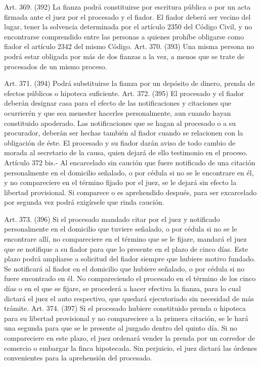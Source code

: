     Art. 369. (392) La fianza podrá constituirse por escritura pública o por un acta firmada ante el juez por el procesado y el fiador.
    El fiador deberá ser vecino del lugar, tener la solvencia determinada por el artículo 2350 del Código Civil, y no encontrarse comprendido entre las personas a quienes prohíbe obligarse como fiador el artículo 2342 del mismo Código.
    Art. 370. (393) Una misma persona no podrá estar obligada por más de dos fianzas a la vez, a menos que se trate de procesados de un mismo proceso.


    Art. 371. (394) Podrá substituirse la fianza por un depósito de dinero, prenda de efectos públicos o hipoteca suficiente.
    Art. 372. (395) El procesado y el fiador deberán designar casa para el efecto de las notificaciones y citaciones que ocurrierén y que sea menester hacerles personalmente, aun cuando hayan constituido apoderado.
    Las notificaciones que se hagan al procesado o a su procurador, deberán ser hechas también al fiador cuando se relacionen con la obligación de éste.
    El procesado y su fiador darán aviso de todo cambio de morada al secretario de la causa, quien dejará de ello testimonio en el proceso.
    Artículo 372 bis.- Al encarcelado sin caución que fuere notificado de una citación personalmente en el domicilio señalado, o por cédula si no se le encontrare en él, y no compareciere en el término fijado por el juez, se le dejará sin efecto la libertad provisional.
Si comparece o es aprehendido después, para ser excarcelado por segunda vez podrá exigírsele que rinda caución.

    Art. 373. (396) Si el procesado mandado citar por el juez y notificado personalmente en el domicilio que tuviere señalado, o por cédula si no se le encontrare allí, no compareciere en el término que se le fijare, mandará el juez que se notifique a su fiador para que lo presente en el plazo de cinco días.
    Este plazo podrá ampliarse a solicitud del fiador siempre que hubiere motivo fundado.
    Se notificará al fiador en el domicilio que hubiere señalado, o por cédula si no fuere encontrado en él. No compareciendo el procesado en el término de los cinco días o en el que se fijare, se procederá a hacer efectiva la fianza, para lo cual dictará el juez el auto respectivo, que quedará ejecutoriado sin necesidad de más trámite.
    Art. 374. (397) Si el procesado hubiere constituido prenda o hipoteca para su libertad provisional y no compareciere a la primera citación, se le hará una segunda para que se le presente al juzgado dentro del quinto día. Si no compareciere en este plazo, el juez ordenará vender la prenda por un corredor de comercio o embargar la finca hipotecada. Sin perjuicio, el juez dictará las órdenes convenientes para la aprehensión del procesado.


